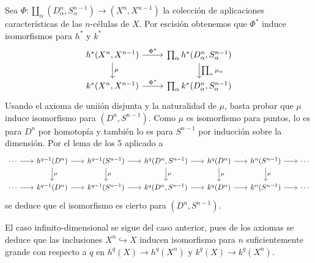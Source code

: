 \documentclass[TA.tex]{subfiles}
\begin{document}
\begin{dem}
Sea $\Phi:\coprod_{\alpha}(D_\alpha^n,S_\alpha^{n-1})\to (X^n,X^{n-1})$ la colección de aplicaciones características de las $n$-células de $X$. Por escisión obtenemos que $\Phi^*$ induce isomorfismos para $h^*$ y $k^*$
\[
\begin{tikzcd}
{h^*(X^n,X^{n-1})} \arrow[r, "\Phi^*"] \arrow[d, "\mu"] & {\prod_\alpha h^*(D_\alpha^n,S_\alpha^{n-1})} \arrow[d, "\prod_\alpha\mu_\alpha"] \\
{k^*(X^n,X^{n-1})} \arrow[r, "\Phi^*"] & {\prod_\alpha k^*(D_\alpha^n,S_\alpha^{n-1})}
\end{tikzcd}
\]
Usando el axioma de uniión disjunta y la naturalidad de $\mu$, basta probar que $\mu$ induce isomorfismo para $(D^n,S^{n-1})$. Como $\mu$ es isomorfismo para puntos, lo es para $D^n$ por homotopía y también lo es para $S^{n-1}$ por inducción sobre la dimensión. Por el lema de los 5 aplicado a 
\[
\begin{tikzcd}[column sep=18]
\cdots \arrow[r] & h^{q-1}(D^n) \arrow[r] \arrow[d, "\mu"] & h^{q-1}(S^{n-1}) \arrow[r] \arrow[d, "\mu"] & {h^{q}(D^n,S^{n-1})} \arrow[r] \arrow[d, "\mu"] & h^{q}(D^n) \arrow[d, "\mu"] \arrow[r] & h^{n}(S^{n-1}) \arrow[r] \arrow[d, "\mu"] & \cdots \\
\cdots \arrow[r] & k^{q-1}(D^n) \arrow[r] & k^{q-1}(S^{n-1}) \arrow[r] & {k^{q}(D^n,S^{n-1})} \arrow[r] & k^{q}(D^n) \arrow[r] & k^{n}(S^{n-1}) \arrow[r] & \cdots
\end{tikzcd}
\]
se deduce que el isomorfismo es cierto para $(D^n,S^{n-1})$. 

El caso infinito-dimensional se sigue del caso anterior, pues de los axiomas se deduce que las inclusiones $X^n\hookrightarrow X$ inducen isomorfismo para $n$ suficientemente grande con respecto a $q$ en $h^q(X)\to h^q(X^n)$ y $k^q(X)\to k^q(X^n)$.
\end{dem}
\end{document}
